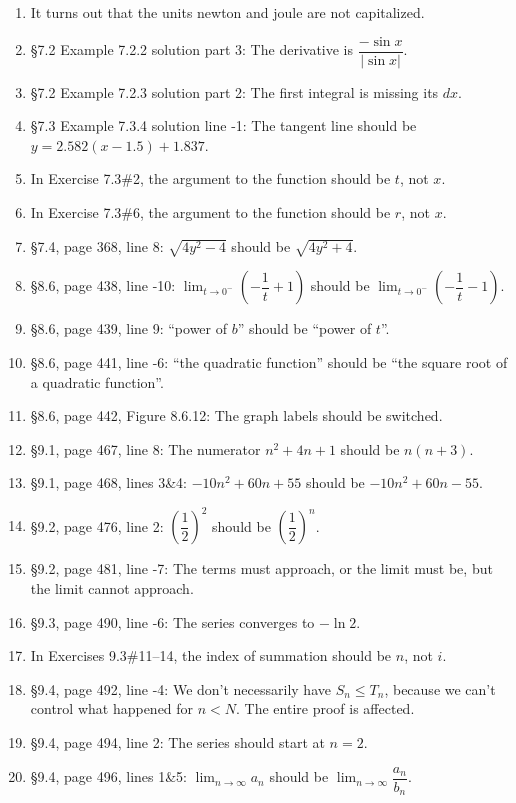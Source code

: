 \documentclass{amsart}
\makeatletter
\newcommand{\ds}{\displaystyle}
\newcommand{\abs}[1]{\left\lvert#1\right\rvert}
\newcommand{\reforzero}[1]{%
 \@ifundefined{r@#1}{0}{\ref{#1}}%
}
\makeatother
\begin{document}
\begin{enumerate}\setcounter{enumi}{\reforzero{2018-07-13}}
\item It turns out that the units newton and joule are not capitalized.
\item \S7.2 Example 7.2.2 solution part 3: The derivative is $\dfrac{-\sin x}{\abs{\sin x}}$.
\item \S7.2 Example 7.2.3 solution part 2: The first integral is missing its $dx$.
\item \S7.3 Example 7.3.4 solution line -1: The tangent line should be $y=2.582(x-1.5)+1.837$.
\item In Exercise 7.3\#2, the argument to the function should be $t$, not $x$.
\item In Exercise 7.3\#6, the argument to the function should be $r$, not $x$.
\item \S7.4, page 368, line 8: $\sqrt{4y^2-4}$ should be $\sqrt{4y^2+4}$.
\item \S8.6, page 438, line -10: $\ds\lim_{t\to0^-}\left(-\dfrac1t+1\right)$ should be $\ds\lim_{t\to0^-}\left(-\dfrac1t-1\right)$.
\item \S8.6, page 439, line 9: ``power of $b$'' should be ``power of $t$''.
\item \S8.6, page 441, line -6: ``the quadratic function'' should be ``the square root of a quadratic function''.
\item \S8.6, page 442, Figure 8.6.12: The graph labels should be switched.
\item \S9.1, page 467, line 8: The numerator $n^2+4n+1$ should be $n(n+3)$.
\item \S9.1, page 468, lines 3\&4: $-10n^2+60n+55$ should be $-10n^2+60n-55$.
\item \S9.2, page 476, line 2: $\left(\dfrac12\right)^2$ should be $\left(\dfrac12\right)^n$.
\item \S9.2, page 481, line -7: The terms must approach, or the limit must be, but the limit cannot approach.
\item \S9.3, page 490, line -6: The series converges to $-\ln 2$.
\item In Exercises 9.3\#11--14, the index of summation should be $n$, not $i$.
\item \S9.4, page 492, line -4: We don't necessarily have $S_n\le T_n$, because we can't control what happened for $n<N$.  The entire proof is affected.
\item \S9.4, page 494, line 2: The series should start at $n=2$.
\item \S9.4, page 496, lines 1\&5: $\ds\lim_{n\to\infty}a_n$ should be $\ds\lim_{n\to\infty}\dfrac{a_n}{b_n}$.

\end{enumerate}
\end{document}
